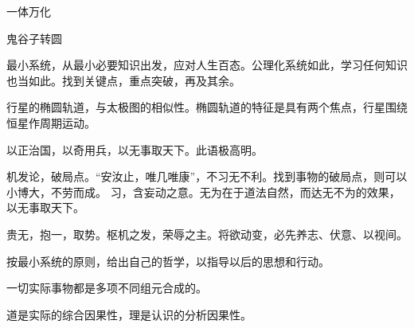 一体万化

鬼谷子转圆

最小系统，从最小必要知识出发，应对人生百态。公理化系统如此，学习任何知识也当如此。找到关键点，重点突破，再及其余。

行星的椭圆轨道，与太极图的相似性。椭圆轨道的特征是具有两个焦点，行星围绕恒星作周期运动。

以正治国，以奇用兵，以无事取天下。此语极高明。

机发论，破局点。“安汝止，唯几唯康”，不习无不利。找到事物的破局点，则可以小博大，不劳而成。
习，含妄动之意。无为在于道法自然，而达无不为的效果，以无事取天下。

贵无，抱一，取势。枢机之发，荣辱之主。将欲动变，必先养志、伏意、以视间。

按最小系统的原则，给出自己的哲学，以指导以后的思想和行动。

一切实际事物都是多项不同组元合成的。

道是实际的综合因果性，理是认识的分析因果性。
